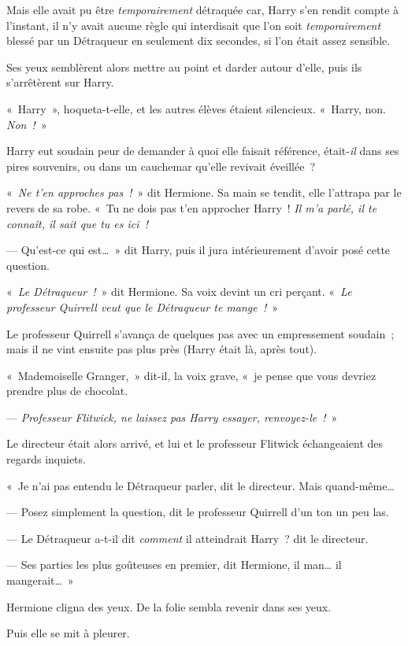 Mais elle avait pu être \emph{temporairement} détraquée car, Harry s'en rendit compte à l'instant, il n'y avait aucune règle qui interdisait que l'on soit \emph{temporairement} blessé par un Détraqueur en seulement dix secondes, si l'on était assez sensible.

Ses yeux semblèrent alors mettre au point et darder autour d'elle, puis ils s'arrêtèrent sur Harry.

«~Harry~», hoqueta-t-elle, et les autres élèves étaient silencieux. «~Harry, non. \emph{Non~!}~»

Harry eut soudain peur de demander à quoi elle faisait référence, était-\emph{il} dans ses pires souvenirs, ou dans un cauchemar qu'elle revivait éveillée~?

«~\emph{Ne t'en approches pas~!}~» dit Hermione. Sa main se tendit, elle l'attrapa par le revers de sa robe. «~Tu ne dois pas t'en approcher Harry~! \emph{Il m'a parlé, il te connaît, il sait que tu es ici~!}

--- Qu'est-ce qui est…~» dit Harry, puis il jura intérieurement d'avoir posé cette question.

«~\emph{Le Détraqueur~!}~» dit Hermione. Sa voix devint un cri perçant. «~\emph{Le professeur Quirrell veut que le Détraqueur te mange~!}~»

Le professeur Quirrell s'avança de quelques pas avec un empressement soudain~; mais il ne vint ensuite pas plus près (Harry était là, après tout).

«~Mademoiselle Granger,~» dit-il, la voix grave, «~je pense que vous devriez prendre plus de chocolat.

--- \emph{Professeur Flitwick, ne laissez pas Harry essayer, renvoyez-le~!}~»

Le directeur était alors arrivé, et lui et le professeur Flitwick échangeaient des regards inquiets.

«~Je n'ai pas entendu le Détraqueur parler, dit le directeur. Mais quand-même…

--- Posez simplement la question, dit le professeur Quirrell d'un ton un peu las.

--- Le Détraqueur a-t-il dit \emph{comment} il atteindrait Harry~? dit le directeur.

--- Ses parties les plus goûteuses en premier, dit Hermione, il man… il mangerait…~»

Hermione cligna des yeux. De la folie sembla revenir dans ses yeux.

Puis elle se mit à pleurer.

